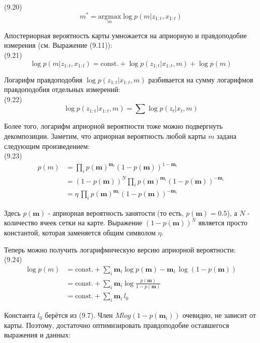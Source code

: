 \documentclass[10pt,a4paper]{article}
\begin{document}
(9.20)
$$m^*=\underset{m}{\text{argmax}}\log p(m|z_{1:t},x_{1:t})$$

Апостериорная вероятность карты умножается на априорную и правдоподобие измерения (см. Выражение (9.11)):\\

(9.21)
$$\log p(m|z_{1:t},x_{1:t})=\text{const.}+\log p(z_{1:t}|x_{1:t},m)+\log p(m)$$

Логарифм правдоподобия $\log p(z_{1:t}|x_{1:t},m)$ разбивается на сумму логарифмов правдоподобия отдельных измерений:\\

(9.22)
$$\log p(z_{1:t}|x_{1:t},m)=\sum\log p(z_t|x_t,m)$$

Более того, логарифм априорной вероятности тоже можно подвергнуть декомпозиции. Заметим, что априорная вероятность любой карты $m$ задана следующим произведением:\\

(9.23)
\begin{equation*}
\begin{split}
p(m)&=\prod_i p(\textbf{m})^{\textbf{m}_i}(1-p(\textbf{m}))^{1-\textbf{m}_i} \\
&=(1-p(\textbf{m}))^N\prod_i p(\textbf{m})^{\textbf{m}_i}(1-p(\textbf{m}))^{-\textbf{m}_i}\\
&=\eta\,\prod_i p(\textbf{m})^{\textbf{m}_i}(1-p(\textbf{m}))^{-\textbf{m}_i}
\end{split}
\end{equation*}

Здесь $p(\textbf{m})$ - априорная вероятность занятости (то есть, $p(\textbf{m}) = 0.5$), а $N$ - количество ячеек сетки на карте. Выражение $(1-p(\textbf{m}))^N$ является просто константой, которая заменяется общим символом $\eta$.

Теперь можно получить логарифмическую версию априорной вероятности:\\

(9.24)
\begin{equation*}
\begin{split}
\log p(m)&=\text{const.}+\sum_i \textbf{m}_i\log p(\textbf{m})-\textbf{m}_i\,\log(1-p(\textbf{m}))\\
&=\text{const.}+\sum_i \textbf{m}_i\log\frac{p(\textbf{m})}{1-p(\textbf{m})}\\
&=\text{const.}+\sum_i \textbf{m}_i\,l_0
\end{split}
\end{equation*}

Константа $l_0$ берётся из (9.7). Член $M log(1-p(\textbf{m}_i))$ очевидно, не зависит от карты. Поэтому, достаточно оптимизировать правдоподобие оставшегося выражения и данных:\\
\end{document}
